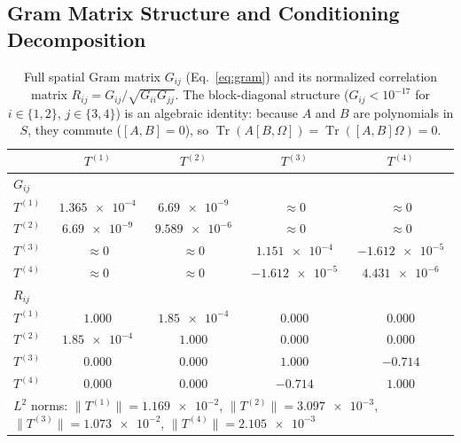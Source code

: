 \documentclass[preprint,aps,prb,longbibliography,superscriptaddress]{revtex4-2}
\newcommand{\Tr}{\operatorname{Tr}}
\begin{document}
\subsection{Gram Matrix Structure and Conditioning Decomposition}
\label{sec:gram_results}

\begin{table}[t]
\caption{Full spatial Gram matrix $G_{ij}$ (Eq.~\ref{eq:gram}) and its
  normalized correlation matrix $R_{ij} = G_{ij}/\sqrt{G_{ii}G_{jj}}$.
  The block-diagonal structure ($G_{ij} < 10^{-17}$ for $i \in \{1,2\}$,
  $j \in \{3,4\}$) is an algebraic identity: because $A$ and $B$ are polynomials
  in $S$, they commute ($[A,B] = 0$), so $\Tr(A[B,\Omega]) = \Tr([A,B]\Omega) = 0$.}\label{tab:gram}
\begin{ruledtabular}
\begin{tabular}{lcccc}
  & $T^{(1)}$ & $T^{(2)}$ & $T^{(3)}$ & $T^{(4)}$ \\
  \midrule
  $G_{ij}$ \\[2pt]
  $T^{(1)}$ & $\num{1.365e-4}$ & $\num{6.69e-9}$ & $\approx 0$ & $\approx 0$ \\
  $T^{(2)}$ & $\num{6.69e-9}$ & $\num{9.589e-6}$ & $\approx 0$ & $\approx 0$ \\
  $T^{(3)}$ & $\approx 0$ & $\approx 0$ & $\num{1.151e-4}$ & $\num{-1.612e-5}$ \\
  $T^{(4)}$ & $\approx 0$ & $\approx 0$ & $\num{-1.612e-5}$ & $\num{4.431e-6}$ \\
  \midrule
  $R_{ij}$ \\[2pt]
  $T^{(1)}$ & $1.000$ & $\num{1.85e-4}$ & $0.000$ & $0.000$ \\
  $T^{(2)}$ & $\num{1.85e-4}$ & $1.000$ & $0.000$ & $0.000$ \\
  $T^{(3)}$ & $0.000$ & $0.000$ & $1.000$ & $-0.714$ \\
  $T^{(4)}$ & $0.000$ & $0.000$ & $-0.714$ & $1.000$ \\
  \midrule
  \multicolumn{5}{l}{$L^2$ norms:
    $\|T^{(1)}\| = \num{1.169e-2}$,
    $\|T^{(2)}\| = \num{3.097e-3}$,
    $\|T^{(3)}\| = \num{1.073e-2}$,
    $\|T^{(4)}\| = \num{2.105e-3}$} \\
\end{tabular}
\end{ruledtabular}
\end{table}
\end{document}
